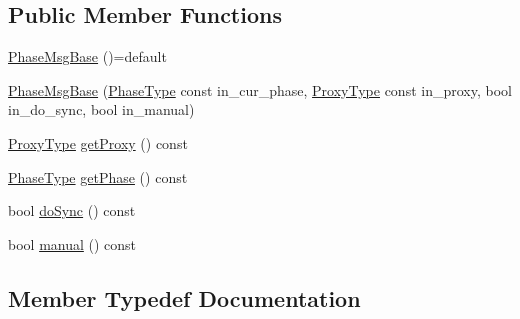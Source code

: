 \subsection*{Public Member Functions}
\begin{DoxyCompactItemize}
\item 
\hyperlink{structvt_1_1vrt_1_1collection_1_1balance_1_1_phase_msg_base_a6dc4fc0633d31368deae1da80cdb9093}{Phase\+Msg\+Base} ()=default
\item 
\hyperlink{structvt_1_1vrt_1_1collection_1_1balance_1_1_phase_msg_base_a10f04955c5a53a65fec9992a9fca8fde}{Phase\+Msg\+Base} (\hyperlink{namespacevt_a46ce6733d5cdbd735d561b7b4029f6d7}{Phase\+Type} const in\+\_\+cur\+\_\+phase, \hyperlink{structvt_1_1vrt_1_1collection_1_1balance_1_1_phase_msg_base_a21c9d10c5a8d1386f4e0a1bfa04f482f}{Proxy\+Type} const in\+\_\+proxy, bool in\+\_\+do\+\_\+sync, bool in\+\_\+manual)
\item 
\hyperlink{structvt_1_1vrt_1_1collection_1_1balance_1_1_phase_msg_base_a21c9d10c5a8d1386f4e0a1bfa04f482f}{Proxy\+Type} \hyperlink{structvt_1_1vrt_1_1collection_1_1balance_1_1_phase_msg_base_a3c7b317ac32bd23c20526952e3aaf499}{get\+Proxy} () const
\item 
\hyperlink{namespacevt_a46ce6733d5cdbd735d561b7b4029f6d7}{Phase\+Type} \hyperlink{structvt_1_1vrt_1_1collection_1_1balance_1_1_phase_msg_base_ac725a307fa6cd208b76e59759428f88c}{get\+Phase} () const
\item 
bool \hyperlink{structvt_1_1vrt_1_1collection_1_1balance_1_1_phase_msg_base_aaf899d4257e3333b7080b3ddc5f77847}{do\+Sync} () const
\item 
bool \hyperlink{structvt_1_1vrt_1_1collection_1_1balance_1_1_phase_msg_base_a972351dacbddafb7d6a5d73d57eda63a}{manual} () const
\end{DoxyCompactItemize}


\subsection{Member Typedef Documentation}
\mbox{\label{structvt_1_1vrt_1_1collection_1_1balance_1_1_phase_msg_base_a21c9d10c5a8d1386f4e0a1bfa04f482f}} 
